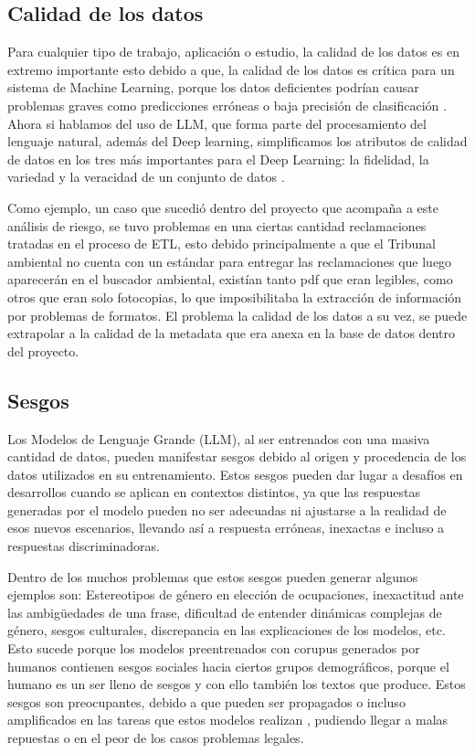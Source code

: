 \newpage

\subsection{Calidad de los datos}

Para cualquier tipo de trabajo, aplicación o estudio, la calidad de los datos es en extremo importante esto debido a que, la calidad de los datos 
es crítica para un sistema de Machine Learning, porque los datos deficientes podrían causar problemas graves como predicciones erróneas o baja 
precisión de clasificación \cite{calidad1}. Ahora si hablamos del uso de LLM, que forma parte del procesamiento del lenguaje natural, además del Deep learning, 
simplificamos los atributos de calidad de datos en los tres más importantes para el Deep Learning: la fidelidad, la variedad y la veracidad de un conjunto de datos \cite{calidad1}.

Como ejemplo, un caso que sucedió dentro del proyecto que acompaña a este análisis de riesgo, se tuvo problemas en una ciertas cantidad reclamaciones tratadas en el proceso 
de ETL, esto debido principalmente a que el Tribunal ambiental no cuenta con un estándar para entregar las reclamaciones que luego aparecerán en el buscador ambiental, existían tanto pdf que eran legibles, como otros 
que eran solo fotocopias, lo que imposibilitaba la extracción de información por problemas de formatos. El problema la calidad de los datos a su vez, se puede extrapolar a la 
calidad de la metadata que era anexa en la base de datos dentro del proyecto.

\subsection{Sesgos} %

Los Modelos de Lenguaje Grande (LLM), al ser entrenados con una masiva cantidad de datos, pueden manifestar sesgos debido al origen y procedencia de los datos utilizados en su entrenamiento. Estos sesgos pueden dar lugar a desafíos en desarrollos cuando se aplican en 
contextos distintos, ya que las respuestas generadas por el modelo pueden no ser adecuadas ni ajustarse a la realidad de 
esos nuevos escenarios, llevando así a respuesta erróneas, inexactas e incluso a respuestas discriminadoras.

Dentro de los muchos problemas que estos sesgos pueden generar algunos ejemplos son: 
Estereotipos de género en elección de ocupaciones, inexactitud ante las ambigüedades de una frase, dificultad de entender dinámicas complejas de género, sesgos culturales, discrepancia en las explicaciones de los modelos, etc. \cite{bias1}
Esto sucede porque los modelos preentrenados con corupus generados por humanos contienen sesgos sociales hacia ciertos grupos demográficos, porque el humano es un ser lleno de sesgos y con ello también los textos que produce. Estos sesgos son preocupantes, debido a que pueden ser propagados o incluso amplificados en las tareas que estos modelos realizan \cite{sesgo2}, pudiendo llegar a malas repuestas o en el peor de los casos problemas legales.


